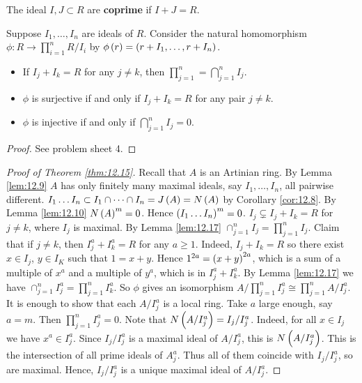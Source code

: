 \begin{definition}
The ideal $ I, J \subset R $ are \textbf{coprime} if $ I + J = R $.
\end{definition}

Suppose $ I_1, \dots, I_n $ are ideals of $ R $. Consider the natural homomorphism $ \phi : R \to \prod_{i = 1}^n R / I_i $ by $ \phi\br{r} = \br{r + I_1, \dots, r + I_n} $.

\begin{lemma}
\label{lem:12.17}
\hfill
\begin{itemize}
\item If $ I_j + I_k = R $ for any $ j \ne k $, then $ \prod_{j = 1}^n = \bigcap_{j = 1}^n I_j $.
\item $ \phi $ is surjective if and only if $ I_j + I_k = R $ for any pair $ j \ne k $.
\item $ \phi $ is injective if and only if $ \bigcap_{j = 1}^n I_j = 0 $.
\end{itemize}
\end{lemma}

\begin{proof}
See problem sheet 4.
\end{proof}

\begin{proof}[Proof of Theorem \ref{thm:12.15}]
Recall that $ A $ is an Artinian ring. By Lemma \ref{lem:12.9} $ A $ has only finitely many maximal ideals, say $ I_1, \dots, I_n $, all pairwise different. $ I_1 \dots I_n \subset I_1 \cap \dots \cap I_n = J\br{A} = N\br{A} $ by Corollary \ref{cor:12.8}. By Lemma \ref{lem:12.10} $ N\br{A}^m = 0 $. Hence $ \br{I_1 \dots I_n}^m = 0 $. $ I_j \subsetneq I_j + I_k = R $ for $ j \ne k $, where $ I_j $ is maximal. By Lemma \ref{lem:12.17} $ \cap_{j = 1}^n I_j = \prod_{j = 1}^n I_j $. Claim that if $ j \ne k $, then $ I_j^a + I_k^a = R $ for any $ a \ge 1 $. Indeed, $ I_j + I_k = R $ so there exist $ x \in I_j $, $ y \in I_K $ such that $ 1 = x + y $. Hence $ 1^{2a} = \br{x + y}^{2a} $, which is a sum of a multiple of $ x^a $ and a multiple of $ y^a $, which is in $ I_j^a + I_k^a $. By Lemma \ref{lem:12.17} we have $ \cap_{j = 1}^n I_j^a = \prod_{j = 1}^n I_k^a $. So $ \phi $ gives an isomorphism $ A / \prod_{j = 1}^n I_j^a \cong \prod_{j = 1}^n A / I_j^a $. It is enough to show that each $ A / I_j^a $ is a local ring. Take $ a $ large enough, say $ a = m $. Then $ \prod_{j = 1}^n I_j^a = 0 $. Note that $ N\br{A / I_j^a} = I_j / I_j^a $. Indeed, for all $ x \in I_j $ we have $ x^a \in I_j^a $. Since $ I_j / I_j^a $ is a maximal ideal of $ A / I_j^a $, this is $ N\br{A / I_j^a} $. This is the intersection of all prime ideals of $ A_j^a $. Thus all of them coincide with $ I_j / I_j^a $, so are maximal. Hence, $ I_j / I_j^a $ is a unique maximal ideal of $ A / I_j^a $.
\end{proof}

